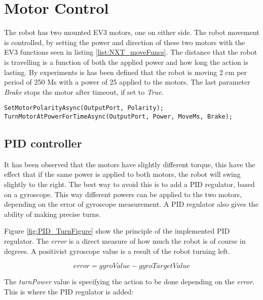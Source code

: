 
\section{Motor Control}
\label{sec:motorControl}

The robot has two mounted EV3 motors, one on either side.
The robot movement is controlled, by setting the power and direction of these two motors with the EV3 functions seen in listing \ref{list:NXT_moveFuncs}.
The distance that the robot is travelling is a function of both the applied power and how long the action is lasting.
By experiments is has been defined that the robot is moving 2 cm per period of 250 Ms with a power of 25 applied to the motors.
The last parameter \emph{Brake} stops the motor after timeout, if set to \emph{True}.

\begin{lstlisting}[caption={The two NXT funtions used to control the motors.}, label=list:NXT_moveFuncs]
SetMotorPolarityAsync(OutputPort, Polarity);
TurnMotorAtPowerForTimeAsync(OutputPort, Power, MoveMs, Brake);
\end{lstlisting}

\subsection{PID controller}

It has been observed that the motors have slightly different torque, this have the effect that if the same power is applied to both motors, the robot will swing slightly to the right.
The best way to avoid this is to add a PID regulator, based on a gyroscope.
This way different powers can be applied to the two motors, depending on the error of gyroscope measurement.
A PID regulator also gives the ability of making precise turns.


Figure \ref{fig:PID_TurnFigure} show the principle of the implemented PID regulator.
The \emph{error} is a direct measure of how much the robot is of course in degrees. A positivist gyroscope value is a result of the robot turning left.

$$ error = gyroValue - gyroTargetValue $$

The \emph{turnPower} value is specifying the action to be done depending on the \emph{error}. This is where the PID regulator is added:

